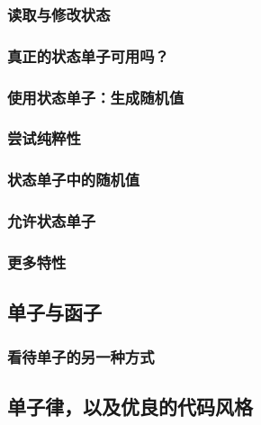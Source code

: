 \documentclass[./main.tex]{subfiles}
\begin{document}
\subsubsection*{读取与修改状态}

\subsubsection*{真正的状态单子可用吗？}

\subsubsection*{使用状态单子：生成随机值}

\subsubsection*{尝试纯粹性}

\subsubsection*{状态单子中的随机值}

\subsubsection*{允许状态单子}

\subsubsection*{更多特性}

\subsection*{单子与函子}

\subsubsection*{看待单子的另一种方式}

\subsection*{单子律，以及优良的代码风格}
\end{document}
